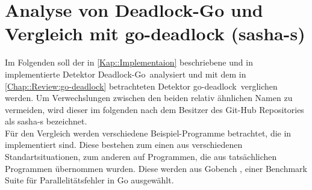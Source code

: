\chapter{Analyse von Deadlock-Go und Vergleich mit 
    go-deadlock (sasha-s)}
Im Folgenden soll der in \ref{Kap::Implementaion} beschriebene und in 
\cite{implementation} implementierte Detektor \glqq Deadlock-Go\grqq\ analysiert 
und mit dem in 
\ref{Chap::Review:go-deadlock} betrachteten Detektor \glqq go-deadlock\grqq\ verglichen
werden. Um Verwechslungen zwischen den beiden relativ ähnlichen Namen zu vermeiden,
wird dieser im folgenden nach dem Besitzer des Git-Hub Repositories als sasha-s
bezeichnet.\\
Für den Vergleich werden verschiedene Beispiel-Programme betrachtet, die in 
\cite{examples} implementiert sind. Diese bestehen zum einen aus verschiedenen 
Standartsituationen, zum anderen auf Programmen, die aus tatsächlichen
Programmen übernommen wurden. Diese werden aus Gobench \cite{gobench}, einer 
Benchmark Suite für Parallelitätsfehler in Go ausgewählt.
